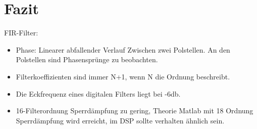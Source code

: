 \section{Fazit}

FIR-Filter:
\begin{itemize}
\item Phase: Linearer abfallender Verlauf Zwischen zwei Polstellen. An den Polstellen sind Phasensprünge zu beobachten.
\item Filterkoeffizienten sind immer N+1, wenn N die Ordnung beschreibt.
\item Die Eckfrequenz eines digitalen Filters liegt bei -6db. 
\item 16-Filterordnung Sperrdämpfung zu gering, Theorie Matlab mit 18 Ordnung Sperrdämpfung wird erreicht, im DSP sollte verhalten ähnlich sein.
\end{itemize}